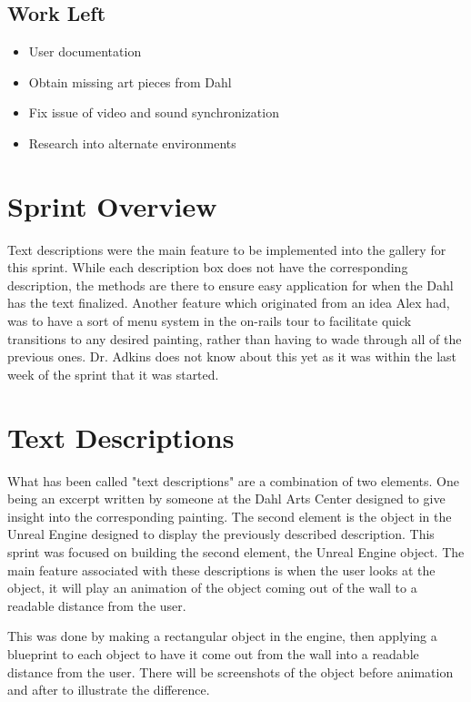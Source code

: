 \subsection*{Work Left}
\begin{itemize}
\item User documentation
\item Obtain missing art pieces from Dahl
\item Fix issue of video and sound synchronization
\item Research into alternate environments
\end{itemize}

\section*{Sprint Overview}
Text descriptions were the main feature to be implemented into the gallery for this sprint.  While each description box does not have the corresponding description, the methods are there to ensure easy application for when the Dahl has the text finalized.  Another feature which originated from an idea Alex had, was to have a sort of menu system in the on-rails tour to facilitate quick transitions to any desired painting, rather than having to wade through all of the previous ones. Dr. Adkins does not know about this yet as it was within the last week of the sprint that it was started. 

\section*{Text Descriptions}
What has been called "text descriptions" are a combination of two elements.  One being an excerpt written by someone at the Dahl Arts Center designed to give insight into the corresponding painting.  The second element is the object in the Unreal Engine designed to display the previously described description.  This sprint was focused on building the second element, the Unreal Engine object.  The main feature associated with these descriptions is when the user looks at the object, it will play an animation of the object coming out of the wall to a readable distance from the user.  

This was done by making a rectangular object in the engine, then applying a blueprint to each object to have it come out from the wall into a readable distance from the user.  There will be screenshots of the object before animation and after to illustrate the difference.

